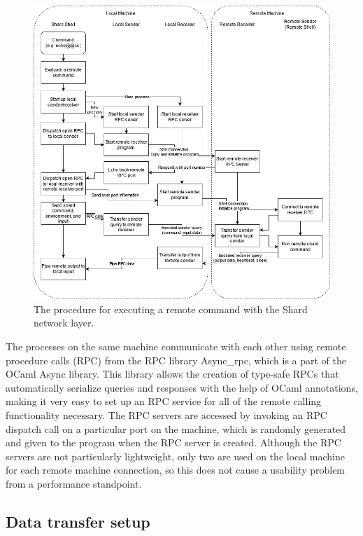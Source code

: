 \documentclass[oneside]{report}
\begin{document}
\begin{figure}[h]
  \begin{center}
    \includegraphics[scale=0.49]{img/shard_protocol_impl.png}
    \caption{The procedure for executing a remote command with the Shard network layer.}
    \label{fig:network_layer_impl}
  \end{center}
\end{figure}

The processes on the same machine communicate with each other using remote procedure calls (RPC) from the RPC library Async\_rpc, which is a part of the OCaml Async library.
This library allows the creation of type-safe RPCs that automatically serialize queries and responses with the help of OCaml annotations, making it very easy to set up an RPC service for all of the remote calling functionality necessary.
The RPC servers are accessed by invoking an RPC dispatch call on a particular port on the machine, which is randomly generated and given to the program when the RPC server is created.
Although the RPC servers are not particularly lightweight, only two are used on the local machine for each remote machine connection, so this does not cause a usability problem from a performance standpoint.

\subsection{Data transfer setup}
\end{document}
